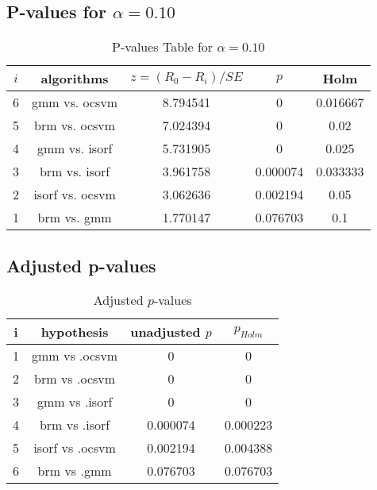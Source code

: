 \documentclass[a4paper,10pt]{article}
\begin{document}
\begin{landscape}
\pagebreak

\subsection{P-values for $\alpha=0.10$}

\begin{table}[!htp]
\centering\scriptsize
\begin{tabular}{ccccc}
$i$&algorithms&$z=(R_0 - R_i)/SE$&$p$&Holm\\
\hline6&gmm vs. ocsvm&8.794541&0&0.016667\\
5&brm vs. ocsvm&7.024394&0&0.02\\
4&gmm vs. isorf&5.731905&0&0.025\\
3&brm vs. isorf&3.961758&0.000074&0.033333\\
2&isorf vs. ocsvm&3.062636&0.002194&0.05\\
1&brm vs. gmm&1.770147&0.076703&0.1\\
\hline
\end{tabular}
\caption{P-values Table for $\alpha=0.10$}
\end{table}\pagebreak

\subsection{Adjusted p-values}

\begin{table}[!htp]
\centering\scriptsize
\begin{tabular}{cccc}
i&hypothesis&unadjusted $p$&$p_{Holm}$\\
\hline1&gmm vs .ocsvm&0&0\\
2&brm vs .ocsvm&0&0\\
3&gmm vs .isorf&0&0\\
4&brm vs .isorf&0.000074&0.000223\\
5&isorf vs .ocsvm&0.002194&0.004388\\
6&brm vs .gmm&0.076703&0.076703\\
\hline
\end{tabular}
\caption{Adjusted $p$-values}
\end{table}

\end{landscape}
\end{document}
